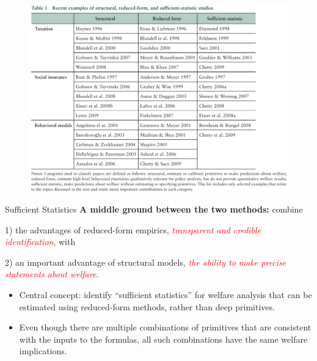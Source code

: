 \documentclass{beamer}
\begin{document}
\begin{frame}
	\begin{figure}[h]
		\centering
		\includegraphics[scale=0.65]{table1.png}
	\end{figure}
\end{frame}
\begin{frame}{Sufficient Statistics}
	\textbf{A middle ground between the two methods:} combine
	
	1) the advantages of reduced-form empirics, \textcolor{red}{\textit{transparent and credible identification}}, with 
	
	2) an important advantage of structural models, \textcolor{red}{\textit{the ability to make precise statements about welfare}}.
	\medskip
	\begin{itemize}
		\item Central concept: identify “sufficient statistics” for welfare analysis that can be estimated using reduced-form methods, rather than deep primitives.
		\item Even though there are multiple combinations of primitives that are consistent with the inputs to the formulas, all such combinations have the same welfare implications.
	\end{itemize}
\end{frame}
\end{document}
